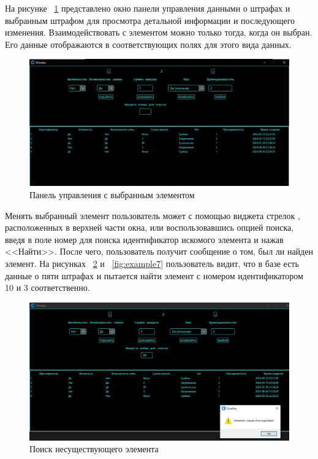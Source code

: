 На рисунке ~\ref{fig:example5} представлено окно панели управления данными о штрафах и выбранным штрафом для просмотра детальной информации и последующего изменения. 
Взаимодействовать с элементом можно только тогда, когда он выбран. Его данные отображаются в соответствующих полях для этого вида данных. 
\begin{figure}[ht]
	\centering
	\includegraphics[width=1\linewidth]{images/Example5}
	\caption{Панель управления с выбранным элементом}
	\label{fig:example5}
\end{figure}

Менять выбранный элемент пользователь может с помощью виджета \textquotedbl стрелок \textquotedbl, расположенных в верхней части окна, или воспользовавшись опцией поиска, введя в поле \textquotedbl номер для поиска \textquotedbl идентификатор искомого элемента и нажав <<Найти>>. После чего, пользователь получит сообщение о том, был ли найден элемент.
На рисунках  ~\ref{fig:example6} и ~\ref{fig:example7} пользователь видит, что в базе есть данные о пяти штрафах и пытается найти элемент с номером идентификатором 10 и 3 соответственно.
\begin{figure}[ht]
	\centering
	\includegraphics[width=1\linewidth]{images/Example6}
	\caption{Поиск несуществующего элемента}
	\label{fig:example6}
\end{figure}

